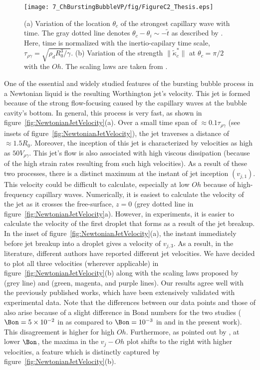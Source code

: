 \begin{subappendices}
\begin{figure}
	\centering
	\texttt{[image: 7\_ChBurstingBubbleVP/fig/FigureC2\_Thesis.eps]}
	\caption{(a) Variation of the location $\theta_c$ of the strongest capillary wave with time. The gray dotted line denotes $\theta_c - \theta_i \sim -\tilde t$ as described by \citep{gordillo2019capillary}. Here, time is normalized with the inertio-capilary time scale, $\tau_{\rho\gamma} = \sqrt{\rho_d R_0^3/\gamma}$. (b) Variation of the strength $\|\tilde \kappa_c^*\|$ at $\theta_c = \pi/2$ with the $Oh$. The scaling laws are taken from \citet{gordillo2019capillary}.}
	\label{fig:CapillaryWavesComparision}
\end{figure}

One of the essential and widely studied features of the bursting bubble process in a Newtonian liquid is the resulting Worthington jet's velocity. This jet is formed because of the strong flow-focusing caused by the capillary waves at the bubble cavity's bottom. In general, this process is very fast, as shown in figure~\ref{fig:NewtonianJetVelocity}(a). Over a small time span of $\approx 0.1\tau_{\rho\gamma}$ (see insets of figure~\ref{fig:NewtonianJetVelocity}), the jet traverses a distance of $\approx 1.5R_0$. Moreover, the inception of this jet is characterized by velocities as high as $50V_{\rho\gamma}$.  This jet's flow is also associated with high viscous dissipation (because of the high strain rates resulting from such high velocities). As a result of these two processes, there is a distinct maximum at the instant of jet inception  $\left(v_{j,1}\right)$. This velocity could be difficult to calculate, especially at low $Oh$ because of high-frequency capillary waves. Numerically, it is easiest to calculate the velocity of the jet as it crosses the free-surface, $z = 0$ (grey dotted line in figure~\ref{fig:NewtonianJetVelocity}a). However, in experiments, it is easier to calculate the velocity of the first droplet that forms as a result of the jet breakup. In the inset of figure~\ref{fig:NewtonianJetVelocity}(a), the instant immediately before jet breakup into a droplet gives a velocity of $v_{j,3}$. As a result, in the literature, different authors have reported different jet velocities. We have decided to plot all three velocities (wherever applicable) in figure~\ref{fig:NewtonianJetVelocity}(b) along with the scaling laws proposed by \citet{deike2018dynamics} (grey line) and \citet{gordillo2019capillary} (green, magenta, and purple lines). Our results agree well with the previously published works, which have been extensively validated with experimental data. Note that the differences between our data points and those of \citet{gordillo2019capillary} also arise because of a slight difference in Bond numbers for the two studies ($\Bon = 5\times 10^{-2}$ in \citet{gordillo2019capillary} as compared to $\Bon = 10^{-3}$ in \citet{deike2018dynamics} and in the present work). This disagreement is higher for high $Oh$. Furthermore, as pointed out by \citet{deike2018dynamics}, at lower $\Bon$, the maxima in the $v_j - Oh$ plot shifts to the right with higher velocities, a feature which is distinctly captured by figure~\ref{fig:NewtonianJetVelocity}(b).


\end{subappendices}
